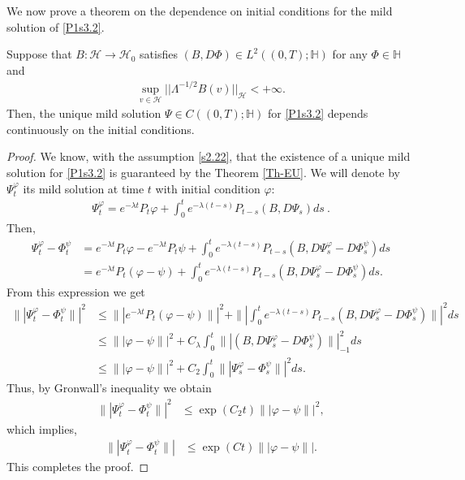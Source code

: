\documentclass[review, onefignum, onetabnum]{siamart171218}
\begin{document}
 We now prove a theorem on the dependence on initial conditions for the mild
solution of \eqref{P1s3.2}.
 \begin{theorem}\label{Cont-Mild-Sol}
Suppose that $B:\mathcal{H}\rightarrow \mathcal{H}_0$ satisfies $(B,D\Phi)\in
L^2((0,T);\mathbb{H})$ for any $\Phi\in\mathbb{H}$ and
 \begin{align}\label{s2.22}
  \sup_{v\in \mathcal{H}} ||\Lambda^{-1/2}B(v)||_{\mathcal{H}}<+\infty.
 \end{align}
 Then, the unique mild solution $\Psi\in C((0,T); \mathbb{H})$ for
\eqref{P1s3.2} depends continuously on the initial conditions.

 \end{theorem}
\begin{proof}
We know, with the assumption \eqref{s2.22}, that the existence of a unique
mild solution for \eqref{P1s3.2} is guaranteed by the Theorem \ref{Th-EU}. We
will denote by $\Psi_t^\varphi$ its mild solution at time $t$ with initial
condition $\varphi$:
\begin{align*}
\Psi_t^\varphi=e^{-\lambda t} P_t  \varphi+  \int_0^t e^{-\lambda
(t-s)}P_{t-s}(B,D\Psi_s) ds \ .
\end{align*}
Then,
\begin{align*}
    \Psi_t^\varphi-\Phi_t^\psi
        &=  e^{-\lambda t} P_t \varphi -e^{-\lambda t} P_t
        \psi +  
        \int_0^t e^{-\lambda (t-s)}P_{t-s}(B,D\Psi_s^\varphi-D\Phi_s^\psi) ds
        \\
        &= e^{-\lambda t} P_t (\varphi - \psi) 
        + \int_0^t
            e^{-\lambda(t-s)} P_{t-s} (B, D \Psi_s^\varphi - D\Phi_s^\psi) ds.
\end{align*}
From this expression we get
\begin{align*}
\| | \Psi_t^\varphi-\Phi_t^\psi\| |^2&\le \| |e^{-\lambda t} P_t (\varphi -
\psi)\| |^2+\| | \int_0^t e^{-\lambda
(t-s)}P_{t-s}(B,D\Psi_s^\varphi-D\Phi_s^\psi) \| |^2ds\\
&\le  \|  |\varphi - \psi\| |^2+ C_\lambda\int_0^t  \|
|(B,D\Psi_s^\varphi-D\Phi_s^\psi) \| |_{-1}^2 ds\\
&\le  \|  |\varphi - \psi\| |^2+ C_2\int_0^t  \| |\Psi_s^\varphi-\Phi_s^\psi
\| |^2 ds.
\end{align*}
Thus, by Gronwall's inequality we obtain
\begin{align}\label{s2.23}
    \| |
         \Psi_t^\varphi-\Phi_t^\psi\| |^2&\le \exp(C_2t)  \|  | \varphi - 
         \psi
    \| |^2, 
\end{align}
which implies,
\begin{align*}
\| | \Psi_t^\varphi-\Phi_t^\psi\| |&\le \exp(Ct)  \| | \varphi - \psi\| |.
\end{align*}
This completes the proof.
\end{proof}
\end{document}
